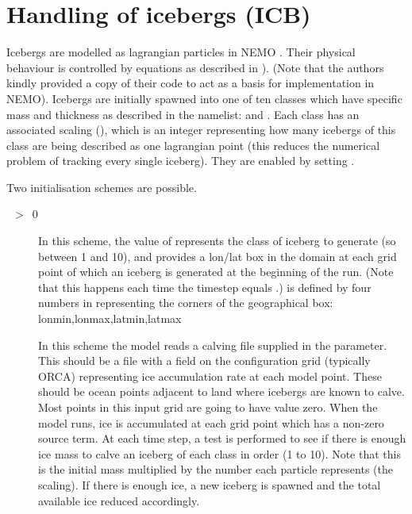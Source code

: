 \documentclass[../main/NEMO_manual]{subfiles}
\begin{document}
%
\section{Handling of icebergs (ICB)}
\label{sec:ICB_icebergs}


Icebergs are modelled as lagrangian particles in NEMO \citep{Marsh_GMD2015}.
Their physical behaviour is controlled by equations as described in \citet{Martin_Adcroft_OM10} ).
(Note that the authors kindly provided a copy of their code to act as a basis for implementation in NEMO).
Icebergs are initially spawned into one of ten classes which have specific mass and thickness as
described in the  namelist:  and .
Each class has an associated scaling (),
which is an integer representing how many icebergs of this class are being described as one lagrangian point
(this reduces the numerical problem of tracking every single iceberg).
They are enabled by setting .

Two initialisation schemes are possible.
\begin{description}
\item[~$>$~0]
  In this scheme, the value of  represents the class of iceberg to generate
  (so between 1 and 10), and  provides a lon/lat box in the domain at each grid point of
  which an iceberg is generated at the beginning of the run.
  (Note that this happens each time the timestep equals .)
   is defined by four numbers in  representing the corners of
  the geographical box: lonmin,lonmax,latmin,latmax
\item[]
  In this scheme the model reads a calving file supplied in the  parameter.
  This should be a file with a field on the configuration grid (typically ORCA)
  representing ice accumulation rate at each model point.
  These should be ocean points adjacent to land where icebergs are known to calve.
  Most points in this input grid are going to have value zero.
  When the model runs, ice is accumulated at each grid point which has a non-zero source term.
  At each time step, a test is performed to see if there is enough ice mass to
  calve an iceberg of each class in order (1 to 10).
  Note that this is the initial mass multiplied by the number each particle represents (\ie the scaling).
  If there is enough ice, a new iceberg is spawned and the total available ice reduced accordingly.
\end{description}
\end{document}
